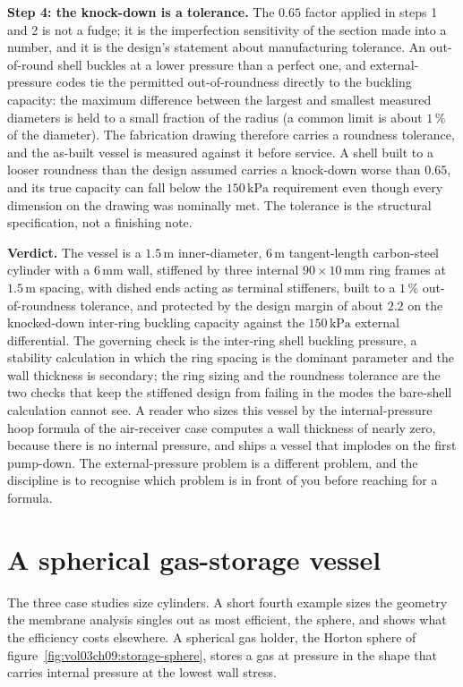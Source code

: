 \textbf{Step 4: the knock-down is a tolerance.} The $0.65$ factor applied
in steps 1 and 2 is not a fudge; it is the imperfection sensitivity of
the section made into a number, and it is the design's statement about
manufacturing tolerance. An out-of-round shell buckles at a lower
pressure than a perfect one, and external-pressure codes tie the
permitted out-of-roundness directly to the buckling capacity: the
maximum difference between the largest and smallest measured diameters is
held to a small fraction of the radius (a common limit is about $1\,\%$
of the diameter). The fabrication drawing therefore carries a roundness
tolerance, and the as-built vessel is measured against it before service.
A shell built to a looser roundness than the design assumed carries a
knock-down worse than $0.65$, and its true capacity can fall below the
$150\,\text{kPa}$ requirement even though every dimension on the drawing
was nominally met. The tolerance is the structural specification, not a
finishing note.

\textbf{Verdict.} The vessel is a $1.5\,\si{\meter}$ inner-diameter,
$6\,\si{\meter}$ tangent-length carbon-steel cylinder with a $6\,\si{
\milli\meter}$ wall, stiffened by three internal $90\times 10\,\si{
\milli\meter}$ ring frames at $1.5\,\si{\meter}$ spacing, with dished
ends acting as terminal stiffeners, built to a $1\,\%$ out-of-roundness
tolerance, and protected by the design margin of about $2.2$ on the
knocked-down inter-ring buckling capacity against the $150\,\text{kPa}$
external differential. The governing check is the inter-ring shell
buckling pressure, a stability calculation in which the ring spacing is
the dominant parameter and the wall thickness is secondary; the ring
sizing and the roundness tolerance are the two checks that keep the
stiffened design from failing in the modes the bare-shell calculation
cannot see. A reader who sizes this vessel by the internal-pressure hoop
formula of the air-receiver case computes a wall thickness of nearly
zero, because there is no internal pressure, and ships a vessel that
implodes on the first pump-down. The external-pressure problem is a
different problem, and the discipline is to recognise which problem is in
front of you before reaching for a formula.

\section{A spherical gas-storage vessel}

The three case studies size cylinders. A short fourth example sizes the
geometry the membrane analysis singles out as most efficient, the sphere,
and shows what the efficiency costs elsewhere. A spherical gas holder, the
Horton sphere of figure~\ref{fig:vol03ch09:storage-sphere}, stores a gas
at pressure in the shape that carries internal pressure at the lowest
wall stress.

